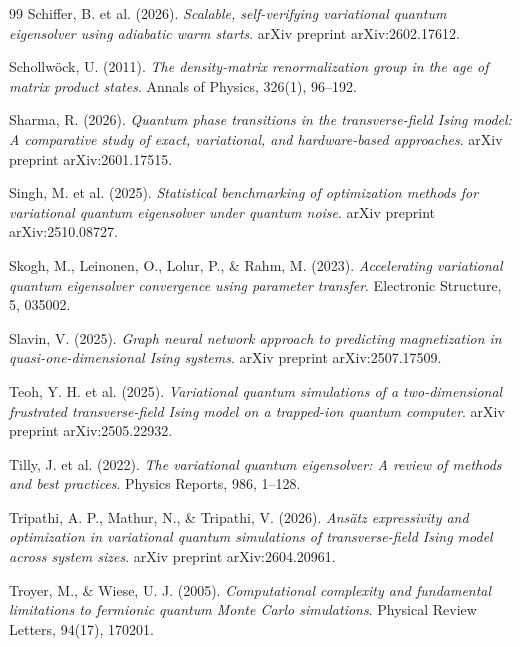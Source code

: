 \documentclass[11pt,a4paper,spanish]{book}
\begin{document}
\begin{thebibliography}{99}
 Schiffer, B. et al. (2026). \emph{Scalable, self-verifying variational quantum eigensolver using adiabatic warm starts}. arXiv preprint arXiv:2602.17612.

 Schollw\"ock, U. (2011). \emph{The density-matrix renormalization group in the age of matrix product states}. Annals of Physics, 326(1), 96--192.

 Sharma, R. (2026). \emph{Quantum phase transitions in the transverse-field Ising model: A comparative study of exact, variational, and hardware-based approaches}. arXiv preprint arXiv:2601.17515.

 Singh, M. et al. (2025). \emph{Statistical benchmarking of optimization methods for variational quantum eigensolver under quantum noise}. arXiv preprint arXiv:2510.08727.


 Skogh, M., Leinonen, O., Lolur, P., \& Rahm, M. (2023). \emph{Accelerating variational quantum eigensolver convergence using parameter transfer}. Electronic Structure, 5, 035002.

 Slavin, V. (2025). \emph{Graph neural network approach to predicting magnetization in quasi-one-dimensional Ising systems}. arXiv preprint arXiv:2507.17509.


 Teoh, Y. H. et al. (2025). \emph{Variational quantum simulations of a two-dimensional frustrated transverse-field Ising model on a trapped-ion quantum computer}. arXiv preprint arXiv:2505.22932.

 Tilly, J. et al. (2022). \emph{The variational quantum eigensolver: A review of methods and best practices}. Physics Reports, 986, 1--128.

 Tripathi, A. P., Mathur, N., \& Tripathi, V. (2026). \emph{Ans\"atz expressivity and optimization in variational quantum simulations of transverse-field Ising model across system sizes}. arXiv preprint arXiv:2604.20961.

 Troyer, M., \& Wiese, U. J. (2005). \emph{Computational complexity and fundamental limitations to fermionic quantum Monte Carlo simulations}. Physical Review Letters, 94(17), 170201.


\end{thebibliography}
\end{document}
